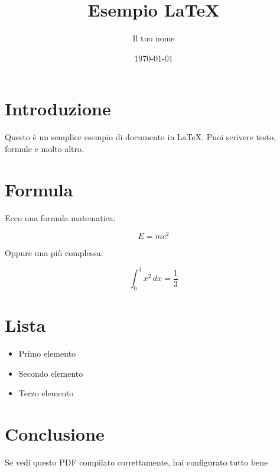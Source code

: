 \documentclass[a4paper,12pt]{article}
\title{Esempio LaTeX}
\author{Il tuo nome}
\date{\today}
\begin{document}
\maketitle

\section{Introduzione}
Questo è un semplice esempio di documento in \LaTeX.  
Puoi scrivere testo, formule e molto altro.

\section{Formula}
Ecco una formula matematica:

\[
E = mc^2
\]

Oppure una più complessa:

\[
\int_0^1 x^2 \, dx = \frac{1}{3}
\]

\section{Lista}
\begin{itemize}
    \item Primo elemento
    \item Secondo elemento
    \item Terzo elemento
\end{itemize}

\section{Conclusione}
Se vedi questo PDF compilato correttamente, hai configurato tutto bene 
\end{document}
